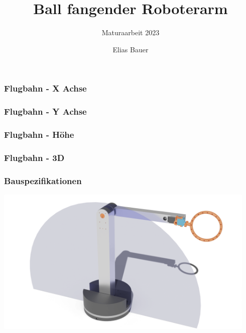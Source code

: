 \documentclass[aspectratio=169]{beamer}
\title {Ball fangender Roboterarm}
\date[Maturaarbeit]{}
\subtitle{Maturaarbeit 2023}
\author{Elias Bauer}
\institute{Kollegium St. Fidelis}
\begin{document}

\frame[plain, label = title]{\titlepage}

\begin{frame}[label = xFlight]
	\frametitle{Flugbahn - X Achse}
	\begin{center}
		\FlightPathX
	\end{center}
\end{frame}

\begin{frame}[label = yFlight]
	\frametitle{Flugbahn - Y Achse}
	\begin{center}
		\FlightPathY
	\end{center}
\end{frame}

\begin{frame}[label = zFlight]
	\frametitle{Flugbahn - Höhe}
	\begin{center}
		\FlightPathZ
	\end{center}
\end{frame}

\begin{frame}[label = 3DFlight]
	\frametitle{Flugbahn - 3D}
	\begin{center}
		\FlightPath
	\end{center}
\end{frame}

\begin{frame}[label = ArmPictures]
	\frametitle{Bauspezifikationen}
	\begin{center}
		\includegraphics[height = 200pt]{../resources/ArmOnPlane1}
	\end{center}
\end{frame}
\end{document}
